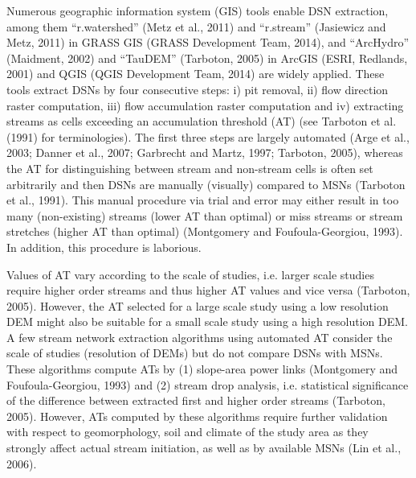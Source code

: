 Numerous geographic information system (GIS) tools enable DSN extraction, among them “r.watershed” (Metz et al., 2011) and “r.stream” (Jasiewicz and Metz, 2011) in GRASS GIS (GRASS Development Team, 2014), and “ArcHydro” (Maidment, 2002) and “TauDEM” (Tarboton, 2005) in ArcGIS (ESRI, Redlands, 2001) and QGIS (QGIS Development Team, 2014) are widely applied. These tools extract DSNs by four consecutive steps: i) pit removal, ii) flow direction raster computation, iii) flow accumulation raster computation and iv) extracting streams as cells exceeding an accumulation threshold (AT) (see Tarboton et al. (1991) for terminologies). The first three steps are largely automated  (Arge et al., 2003; Danner et al., 2007; Garbrecht and Martz, 1997; Tarboton, 2005), whereas the AT for distinguishing between stream and non-stream cells is often set arbitrarily and then DSNs are manually (visually) compared to MSNs (Tarboton et al., 1991). This manual procedure via trial and error may either result in too many (non-existing) streams (lower AT than optimal) or miss streams or stream stretches (higher AT than optimal) (Montgomery and Foufoula-Georgiou, 1993). In addition, this procedure is laborious. 

Values of AT vary according to the scale of studies, i.e. larger scale studies require higher order streams and thus higher AT values and vice versa (Tarboton, 2005). However, the AT selected for a large scale study using a low resolution DEM might also be suitable for a small scale study using a high resolution DEM. A few stream network extraction algorithms using automated AT consider the scale of studies (resolution of DEMs) but do not compare DSNs with MSNs. These algorithms compute ATs by (1) slope-area power links (Montgomery and Foufoula-Georgiou, 1993) and (2) stream drop analysis, i.e. statistical significance of the difference between extracted first and higher order streams (Tarboton, 2005). However, ATs computed by these algorithms require further validation with respect to geomorphology, soil and climate of the study area as they strongly affect actual stream initiation, as well as by available MSNs (Lin et al., 2006).


